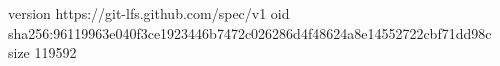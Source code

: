 version https://git-lfs.github.com/spec/v1
oid sha256:96119963e040f3ce1923446b7472c026286d4f48624a8e14552722cbf71dd98c
size 119592
